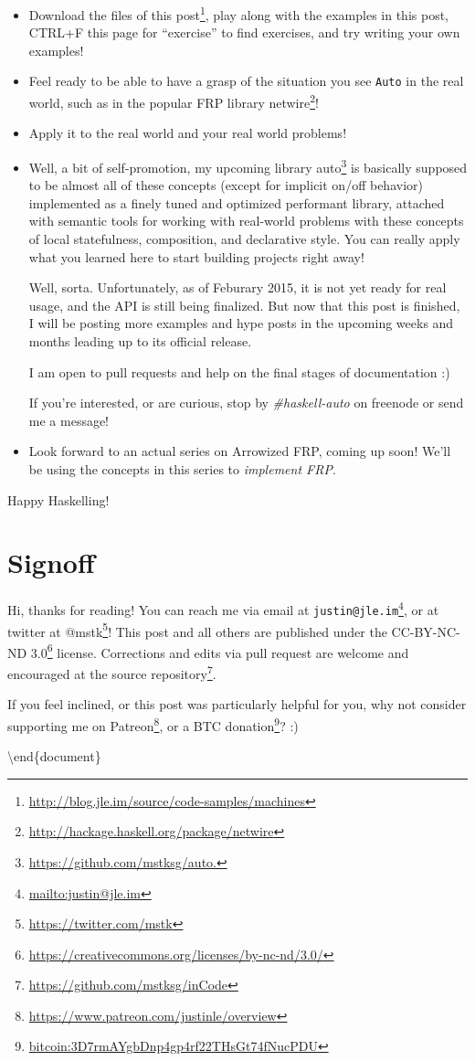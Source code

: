 \documentclass[]{article}
\renewcommand{\href}[2]{#2\footnote{\url{#1}}}
\begin{document}
\begin{itemize}
\item
  \href{http://blog.jle.im/source/code-samples/machines}{Download the files of
  this post}, play along with the examples in this post, CTRL+F this page for
  ``exercise'' to find exercises, and try writing your own examples!
\item
  Feel ready to be able to have a grasp of the situation you see \texttt{Auto}
  in the real world, such as in the popular FRP library
  \href{http://hackage.haskell.org/package/netwire}{netwire}!
\item
  Apply it to the real world and your real world problems!
\item
  Well, a bit of self-promotion, my upcoming library
  \href{https://github.com/mstksg/auto.}{auto} is basically supposed to be
  almost all of these concepts (except for implicit on/off behavior) implemented
  as a finely tuned and optimized performant library, attached with semantic
  tools for working with real-world problems with these concepts of local
  statefulness, composition, and declarative style. You can really apply what
  you learned here to start building projects right away!

  Well, sorta. Unfortunately, as of Feburary 2015, it is not yet ready for real
  usage, and the API is still being finalized. But now that this post is
  finished, I will be posting more examples and hype posts in the upcoming weeks
  and months leading up to its official release.

  I am open to pull requests and help on the final stages of documentation :)

  If you're interested, or are curious, stop by \emph{\#haskell-auto} on
  freenode or send me a message!
\item
  Look forward to an actual series on Arrowized FRP, coming up soon! We'll be
  using the concepts in this series to \emph{implement FRP}.
\end{itemize}

Happy Haskelling!

\section{Signoff}\label{signoff}

Hi, thanks for reading! You can reach me via email at
\href{mailto:justin@jle.im}{\nolinkurl{justin@jle.im}}, or at twitter at
\href{https://twitter.com/mstk}{@mstk}! This post and all others are published
under the \href{https://creativecommons.org/licenses/by-nc-nd/3.0/}{CC-BY-NC-ND
3.0} license. Corrections and edits via pull request are welcome and encouraged
at \href{https://github.com/mstksg/inCode}{the source repository}.

If you feel inclined, or this post was particularly helpful for you, why not
consider \href{https://www.patreon.com/justinle/overview}{supporting me on
Patreon}, or a \href{bitcoin:3D7rmAYgbDnp4gp4rf22THsGt74fNucPDU}{BTC donation}?
:)

\textbackslash end\{document\}
\end{document}
